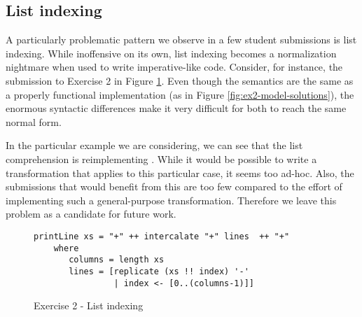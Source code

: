 




\subsection{List indexing}

A particularly problematic pattern we observe in a few student submissions is list indexing. While inoffensive on its own, list indexing becomes a normalization nightmare when used to write imperative-like code. Consider, for instance, the submission to Exercise 2 in Figure \ref{fig:ex2-list-indexing}. Even though the semantics are the same as a properly functional implementation (as in Figure \ref{fig:ex2-model-solutions}), the enormous syntactic differences make it very difficult for both to reach the same normal form.

In the particular example we are considering, we can see that the list comprehension is reimplementing . While it would be possible to write a transformation that applies to this particular case, it seems too ad-hoc. Also, the submissions that would benefit from this are too few compared to the effort of implementing such a general-purpose transformation. Therefore we leave this problem as a candidate for future work.


\begin{figure}
\centering
\begin{verbatim}
printLine xs = "+" ++ intercalate "+" lines  ++ "+"
    where
       columns = length xs
       lines = [replicate (xs !! index) '-'
                | index <- [0..(columns-1)]]
\end{verbatim}
\caption{Exercise 2 - List indexing}
\label{fig:ex2-list-indexing}
\end{figure}

